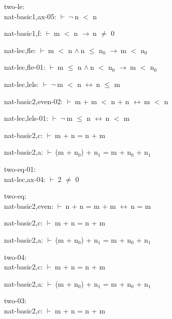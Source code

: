 \documentclass[a4paper]{article}
\newcommand{\Fol}{\mbox{$\vdash\ $}}
\newcommand{\Not}{\mbox{$\neg\ $}}
\newcommand{\And}{\mbox{$\wedge\ $}}
\newcommand{\Imp}{\mbox{$\rightarrow\ $}}
\newcommand{\Equiv}{\mbox{$\leftrightarrow\ $}}
\begin{document}
\bigskip

two-le:\\ nat-basic1,ax-05: 
 \Fol \Not n $<$ n



nat-basic1,f: 
 \Fol m $<$ n \Imp n $\neq$ 0



nat-lec,fle: 
 \Fol m $<$ n \And n $\le$ $\mbox{n}_{0}$ \Imp m $<$ $\mbox{n}_{0}$



nat-lec,fle-01: 
 \Fol m $\le$ n \And n $<$ $\mbox{n}_{0}$ \Imp m $<$ $\mbox{n}_{0}$



nat-lec,lels: 
 \Fol \Not m $<$ n \Equiv n $\le$ m



nat-basic2,even-02: 
 \Fol m + m $<$ n + n \Equiv m $<$ n



nat-lec,lels-01: 
 \Fol \Not m $\le$ n \Equiv n $<$ m



nat-basic2,c: 
 \Fol m + n = n + m



nat-basic2,a: 
 \Fol (m + $\mbox{n}_{0}$) + $\mbox{n}_{1}$ = m + $\mbox{n}_{0}$ + $\mbox{n}_{1}$



\bigskip

two-eq-01:\\ nat-lec,ax-04: 
 \Fol 2 $\neq$ 0



\bigskip

two-eq:\\ nat-basic2,even: 
 \Fol n + n = m + m \Equiv n = m



nat-basic2,c: 
 \Fol m + n = n + m



nat-basic2,a: 
 \Fol (m + $\mbox{n}_{0}$) + $\mbox{n}_{1}$ = m + $\mbox{n}_{0}$ + $\mbox{n}_{1}$



\bigskip

two-04:\\ nat-basic2,c: 
 \Fol m + n = n + m



nat-basic2,a: 
 \Fol (m + $\mbox{n}_{0}$) + $\mbox{n}_{1}$ = m + $\mbox{n}_{0}$ + $\mbox{n}_{1}$



\bigskip

two-03:\\ nat-basic2,c: 
 \Fol m + n = n + m
\end{document}

